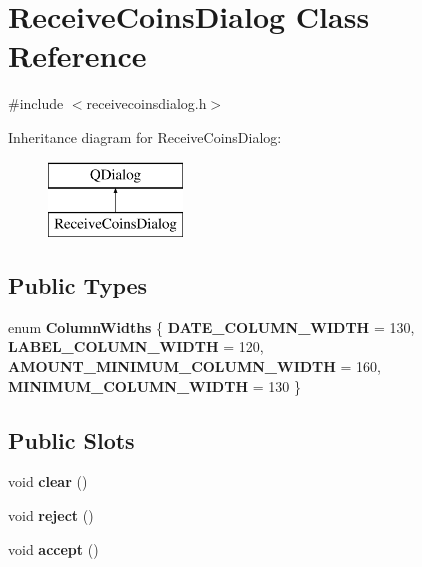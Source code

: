 \hypertarget{class_receive_coins_dialog}{}\section{Receive\+Coins\+Dialog Class Reference}
\label{class_receive_coins_dialog}


{\ttfamily \#include $<$receivecoinsdialog.\+h$>$}

Inheritance diagram for Receive\+Coins\+Dialog\+:\begin{figure}[H]
\begin{center}
\leavevmode
\includegraphics[height=2.000000cm]{class_receive_coins_dialog}
\end{center}
\end{figure}
\subsection*{Public Types}
\begin{DoxyCompactItemize}
\item 
\mbox{\label{class_receive_coins_dialog_a348824c8475841e6e0cb35fdf9090656}} 
enum {\bfseries Column\+Widths} \{ {\bfseries D\+A\+T\+E\+\_\+\+C\+O\+L\+U\+M\+N\+\_\+\+W\+I\+D\+TH} = 130, 
{\bfseries L\+A\+B\+E\+L\+\_\+\+C\+O\+L\+U\+M\+N\+\_\+\+W\+I\+D\+TH} = 120, 
{\bfseries A\+M\+O\+U\+N\+T\+\_\+\+M\+I\+N\+I\+M\+U\+M\+\_\+\+C\+O\+L\+U\+M\+N\+\_\+\+W\+I\+D\+TH} = 160, 
{\bfseries M\+I\+N\+I\+M\+U\+M\+\_\+\+C\+O\+L\+U\+M\+N\+\_\+\+W\+I\+D\+TH} = 130
 \}
\end{DoxyCompactItemize}
\subsection*{Public Slots}
\begin{DoxyCompactItemize}
\item 
\mbox{\label{class_receive_coins_dialog_aaea0511f0ab43f1d2b23f8684d1edfc3}} 
void {\bfseries clear} ()
\item 
\mbox{\label{class_receive_coins_dialog_aeed78dd55cfc9def8b1b3ec3cec4bc11}} 
void {\bfseries reject} ()
\item 
\mbox{\label{class_receive_coins_dialog_aa34d81582b9a1c4311e5cf551aab415e}} 
void {\bfseries accept} ()
\end{DoxyCompactItemize}
